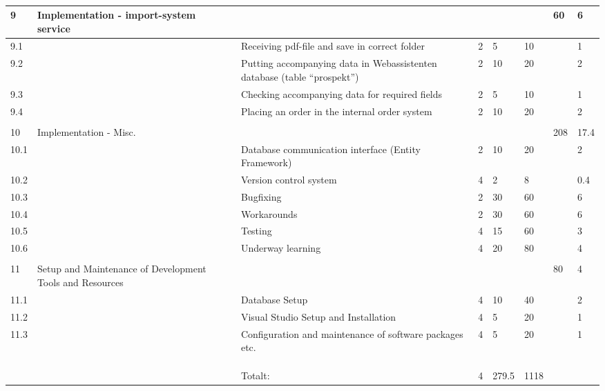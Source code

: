 \begin{table}
\begin{tabular}{|p{0.5cm}|p{2cm}|p{2cm}|p{2cm}|p{2cm}|p{2cm}|p{2cm}|p{2cm}|}
\hline
9 & Implementation - import-system service &  &  &  &  & 60 & 6\\ 
\hline
9.1 &  & Receiving pdf-file and save in correct folder & 2 & 5 & 10 &  & 1\\ 
\hline
9.2 &  & Putting accompanying data in Webassistenten database (table “prospekt”) & 2 & 10 & 20 &  & 2\\ 
\hline
9.3 &  & Checking accompanying data for required fields & 2 & 5 & 10 &  & 1\\ 
\hline
9.4 &  & Placing an order in the internal order system & 2 & 10 & 20 &  & 2\\ 
\hline
 &  &  &  &  &  &  & \\ 
\hline
10 & Implementation - Misc. &  &  &  &  & 208 & 17.4\\ 
\hline
10.1 &  & Database communication interface (Entity Framework) & 2 & 10 & 20 &  & 2\\ 
\hline
10.2 &  & Version control system & 4 & 2 & 8 &  & 0.4\\ 
\hline
10.3 &  & Bugfixing & 2 & 30 & 60 &  & 6\\ 
\hline
10.4 &  & Workarounds & 2 & 30 & 60 &  & 6\\ 
\hline
10.5 &  & Testing & 4 & 15 & 60 &  & 3\\ 
\hline
10.6 &  & Underway learning & 4 & 20 & 80 &  & 4\\ 
\hline
 &  &  &  &  &  &  & \\ 
\hline
11 & Setup and Maintenance of Development Tools and Resources &  &  &  &  & 80 & 4\\ 
\hline
11.1 &  & Database Setup & 4 & 10 & 40 &  & 2\\ 
\hline
11.2 &  & Visual Studio Setup and Installation & 4 & 5 & 20 &  & 1\\ 
\hline
11.3 &  & Configuration and maintenance of software packages etc. & 4 & 5 & 20 &  & 1\\ 
\hline
 &  &  &  &  &  &  & \\ 
\hline
 &  &  &  &  &  &  & \\ 
\hline
 &  &  &  &  &  &  & \\ 
\hline
 &  & Totalt: & 4 & 279.5 & 1118 &  & \\ 
\hline
\hline\end{tabular}
\label{table:table}
\caption{\small{}} 
\end{table}
